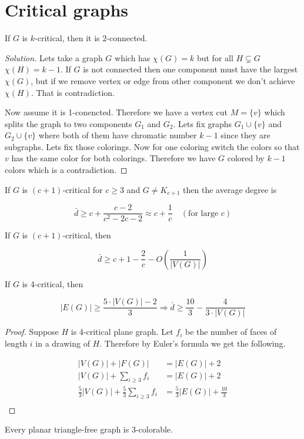 \chapter{Critical graphs}

\begin{exerc}
	If $G$ is $k$-critical, then it is $2$-connected.
\end{exerc}

\begin{proof}[Solution]
	Lets take a graph $G$ which has $\chi(G) = k$ but for all $H \subsetneq G$ $\chi(H) = k-1$. If $G$ is not connected then one component must have the largest $\chi(G)$, but if we remove vertex or edge from other component we don't achieve $\chi(H)$. That is contradiction.
	
	Now assume it is 1-conencted. Therefore we have a vertex cut $M = \{v\}$ which splits the graph to two components $G_1$ and $G_2$. Lets fix graphs $G_1 \cup \{v\}$ and $G_2 \cup \{v\}$ where both of them have chromatic number $k - 1$ since they are subgraphs. Lets fix those colorings. Now for one coloring switch the colors so that $v$ has the same color for both colorings. Therefore we have $G$ colored by $k-1$ colors which is a contradiction.
\end{proof}

\begin{thm}
	If $G$ is $(c+1)$-critical for $c \geq 3$ and $G \neq K_{c+1}$ then the average degree is
	
	$$
	\bar{d} \geq c + \frac{c-2}{c^2 - 2c -2} \approx c + \frac{1}{c} \quad (\text{for large } c)
	$$
\end{thm}

\begin{thm}
	If $G$ is $(c+1)$-critical, then
	
	$$
	\bar{d} \geq c+1 - \frac{2}{c} - O\left( \frac{1}{|V(G)|}\right)
	$$
\end{thm}

\begin{thm}
	If $G$ is 4-critical, then
	
	$$
	|E(G)| \geq \frac{5 \cdot |V(G)| - 2}{3} \Rightarrow \bar{d} \geq \frac{10}{3} - \frac{4}{3 \cdot |V(G)|}
	$$
\end{thm}

\begin{proof}
	Suppose $H$ is 4-critical plane graph. Let $f_i$ be the number of faces of length $i$ in a drawing of $H$. Therefore by Euler's formula we get the following.
	
	$$
	\begin{aligned}
		|V(G)| + |F(G)| &= |E(G)| + 2 \\
		|V(G)| + \sum_{i \geq 3} f_i &= |E(G)| + 2 \\
		\frac{5}{3}|V(G)| + \frac{5}{3}\sum_{i \geq 3} f_i &= \frac{5}{3}|E(G)| + \frac{10}{3} \\
	\end{aligned}
	$$
	
\end{proof}

\begin{thm}[Grötsch]
	Every planar triangle-free graph is 3-colorable.
\end{thm}

